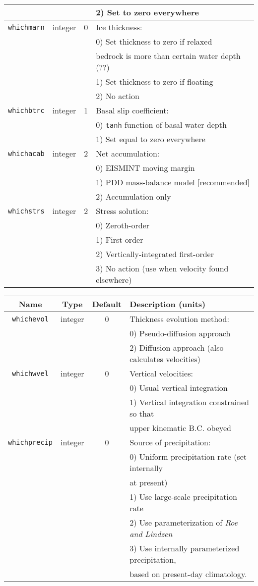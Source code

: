 \documentclass[11pt]{article}
\begin{document}
\begin{center}
\begin{tabular}{|c|c|c|l|}
 & & & 2) Set to zero everywhere \\
\hline
\texttt{whichmarn} & integer & 0 & Ice thickness: \\
 & & & 0) Set thickness to zero if relaxed \\
 & & & bedrock is more than certain water depth (??) \\
 & & & 1) Set thickness to zero if floating \\
 & & & 2) No action \\
\hline
\texttt{whichbtrc} & integer & 1 & Basal slip coefficient: \\
 & & & 0) \texttt{tanh} function of basal water depth \\
 & & & 1) Set equal to zero everywhere \\
\hline
\texttt{whichacab} & integer & 2 & Net accumulation: \\
 & & & 0) EISMINT moving margin \\
 & & & 1) PDD mass-balance model [recommended] \\
 & & & 2) Accumulation only \\
\hline
\texttt{whichstrs} & integer & 2 & Stress solution: \\
 & & & 0) Zeroth-order \\
 & & & 1) First-order \\
 & & & 2) Vertically-integrated first-order \\
 & & & 3) No action (use when velocity found elsewhere) \\
\hline
\end{tabular}
\end{center}
%
%
\begin{center}
\begin{tabular}{|c|c|c|l|}
\hline
Name & Type & Default & Description (units)\\
\hline
\hline 
\texttt{whichevol} & integer & 0 & Thickness evolution method:\\
 & & & 0) Pseudo-diffusion approach \\
 & & & 2) Diffusion approach (also calculates velocities) \\
\hline 
\texttt{whichwvel} & integer & 0 & Vertical velocities: \\
 & & & 0) Usual vertical integration \\
 & & & 1) Vertical integration constrained so that \\
 & & & upper kinematic B.C. obeyed \\
\hline 
\texttt{whichprecip} & integer & 0 & Source of precipitation:\\
 & & & 0) Uniform precipitation rate (set internally \\
 & & &  at present) \\
 & & & 1) Use large-scale precipitation rate \\
 & & & 2) Use parameterization of \emph{Roe and Lindzen} \\
 & & & 3) Use internally parameterized precipitation, \\
 & & &  based on present-day climatology. \\
\hline
\end{tabular}
\end{center}
%
\end{document}
